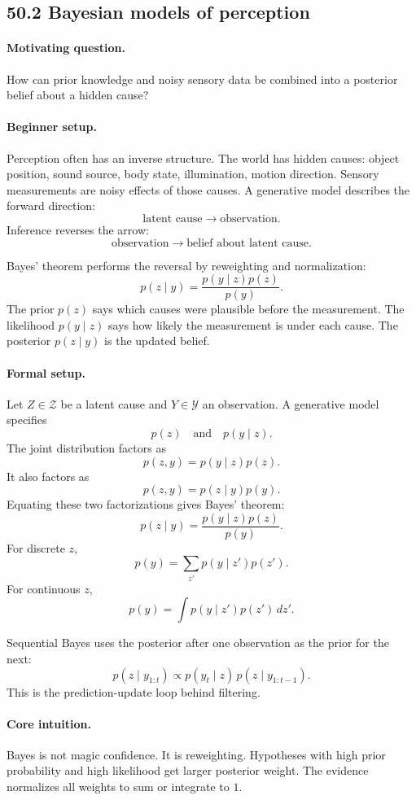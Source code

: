 \subsection{50.2 Bayesian models of perception}

\paragraph{Motivating question.}
How can prior knowledge and noisy sensory data be combined into a posterior belief about a hidden cause?

\paragraph{Beginner setup.}
Perception often has an inverse structure. The world has hidden causes: object position, sound source, body state, illumination, motion direction. Sensory measurements are noisy effects of those causes. A generative model describes the forward direction:
\[
\text{latent cause}\to\text{observation}.
\]
Inference reverses the arrow:
\[
\text{observation}\to\text{belief about latent cause}.
\]

Bayes' theorem performs the reversal by reweighting and normalization:
\[
p(z\mid y)=\frac{p(y\mid z)p(z)}{p(y)}.
\]
The prior \(p(z)\) says which causes were plausible before the measurement. The likelihood \(p(y\mid z)\) says how likely the measurement is under each cause. The posterior \(p(z\mid y)\) is the updated belief.

\paragraph{Formal setup.}
Let \(Z\in\mathcal Z\) be a latent cause and \(Y\in\mathcal Y\) an observation. A generative model specifies
\[
p(z)\quad\text{and}\quad p(y\mid z).
\]
The joint distribution factors as
\[
p(z,y)=p(y\mid z)p(z).
\]
It also factors as
\[
p(z,y)=p(z\mid y)p(y).
\]
Equating these two factorizations gives Bayes' theorem:
\[
\boxed{
p(z\mid y)=\frac{p(y\mid z)p(z)}{p(y)}.
}
\]
For discrete \(z\),
\[
p(y)=\sum_{z'}p(y\mid z')p(z').
\]
For continuous \(z\),
\[
p(y)=\int p(y\mid z')p(z')\,dz'.
\]

Sequential Bayes uses the posterior after one observation as the prior for the next:
\[
\boxed{
p(z\mid y_{1:t})
\propto p(y_t\mid z)\,p(z\mid y_{1:t-1}).
}
\]
This is the prediction-update loop behind filtering.

\paragraph{Core intuition.}
Bayes is not magic confidence. It is reweighting. Hypotheses with high prior probability and high likelihood get larger posterior weight. The evidence normalizes all weights to sum or integrate to \(1\).

